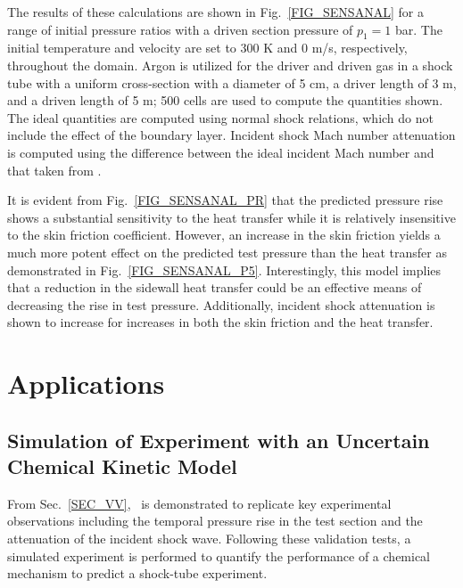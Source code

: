 The results of these calculations are shown in Fig.~\ref{FIG_SENSANAL} for a range of initial pressure ratios with a driven section pressure of $p_1=1$ bar. The initial temperature and velocity are set to 300 K and 0 m/s, respectively, throughout the domain. Argon is utilized for the driver and driven gas in a shock tube with a uniform cross-section with a diameter of 5 cm, a driver length of 3 m, and a driven length of 5 m; 500 cells are used to compute the quantities shown. The ideal quantities are computed using normal shock relations, which do not include the effect of the boundary layer. Incident shock Mach number attenuation is computed using the difference between the ideal incident Mach number and that taken from \stnshk.

It is evident from Fig.~\ref{FIG_SENSANAL_PR} that the predicted pressure rise shows a substantial sensitivity to the heat transfer while it is relatively insensitive to the skin friction coefficient. However, an increase in the skin friction yields a much more potent effect on the predicted test pressure than the heat transfer as demonstrated in Fig.~\ref{FIG_SENSANAL_P5}. Interestingly, this model implies that a reduction in the sidewall heat transfer could be an effective means of decreasing the rise in test pressure. Additionally, incident shock attenuation is shown to increase for increases in both the skin friction and the heat transfer.


\section{Applications}\label{SEC_APPLICATIONS}
\subsection{Simulation of Experiment with an Uncertain Chemical Kinetic Model}
From Sec.~\ref{SEC_VV}, \stnshk\ is demonstrated to replicate key experimental observations including the temporal pressure rise in the test section and the attenuation of the incident shock wave. Following these validation tests, a simulated experiment is performed to quantify the performance of a chemical mechanism to predict a shock-tube experiment. 

